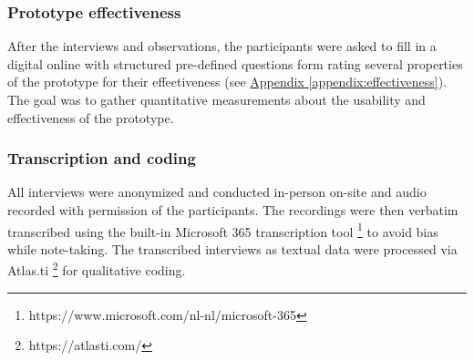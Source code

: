\subsubsection{Prototype effectiveness}

After the interviews and observations, the participants were asked to fill in a digital online with structured pre-defined questions form rating several properties of the prototype for their effectiveness (see \hyperref[appendix:effectiveness]{Appendix \ref*{appendix:effectiveness}}). The goal was to gather quantitative measurements about the usability and effectiveness of the prototype.

\subsubsection{Transcription and coding}
All interviews were anonymized and conducted in-person on-site and audio recorded with permission of the participants. The recordings were then verbatim transcribed using the built-in Microsoft 365 transcription tool \footnote{https://www.microsoft.com/nl-nl/microsoft-365} to avoid bias while note-taking. The transcribed interviews as textual data were processed via Atlas.ti \footnote{https://atlasti.com/} for qualitative coding.